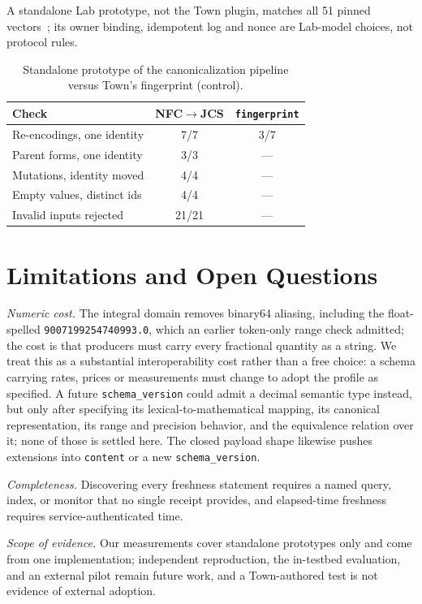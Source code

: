 \documentclass[conference]{IEEEtran}
\begin{document}
A standalone Lab prototype, not the Town plugin, matches all 51 pinned vectors~\cite{artifact}; its owner binding, idempotent log and nonce are Lab-model choices, not protocol rules.

\begin{table}[t]
\caption{Standalone prototype of the canonicalization pipeline versus Town's fingerprint (control).}
\label{tab:proto}
\centering\small
\setlength{\tabcolsep}{4pt}
\begin{tabular}{l|c|c}
\hline
Check & NFC$\rightarrow$JCS & \texttt{fingerprint}\\
\hline
Re-encodings, one identity & 7/7 & 3/7\\
Parent forms, one identity & 3/3 & ---\\
Mutations, identity moved & 4/4 & ---\\
Empty values, distinct ids & 4/4 & ---\\
Invalid inputs rejected & 21/21 & ---\\
\hline
\end{tabular}
\end{table}

\section{Limitations and Open Questions}
\emph{Numeric cost.} The integral domain removes binary64 aliasing, including the float-spelled \texttt{9007199254740993.0}, which an earlier token-only range check admitted; the cost is that producers must carry every fractional quantity as a string. We treat this as a substantial interoperability cost rather than a free choice: a schema carrying rates, prices or measurements must change to adopt the profile as specified. A future \texttt{schema\_version} could admit a decimal semantic type instead, but only after specifying its lexical-to-mathematical mapping, its canonical representation, its range and precision behavior, and the equivalence relation over it; none of those is settled here. The closed payload shape likewise pushes extensions into \texttt{content} or a new \texttt{schema\_version}.

\emph{Completeness.} Discovering every freshness statement requires a named query, index, or monitor that no single receipt provides, and elapsed-time freshness requires service-authenticated time.

\emph{Scope of evidence.} Our measurements cover standalone prototypes only and come from one implementation; independent reproduction, the in-testbed evaluation, and an external pilot remain future work, and a Town-authored test is not evidence of external adoption.
\end{document}
